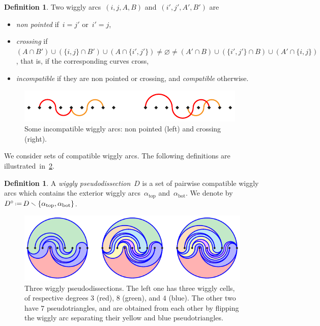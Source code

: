 \documentclass{amsart}
\theoremstyle{definition}
\newtheorem{definition}[theorem]{Definition}
\newcommand{\ssm}{\smallsetminus} %
\newcommand{\eqdef}{\mbox{\,\raisebox{0.2ex}{\scriptsize\ensuremath{\mathrm:}}\ensuremath{=}\,}} %
\newcommand{\darkblue}{\color{darkblue}} %
\newcommand{\defn}[1]{\textsl{\darkblue #1}} %
\begin{document}
\begin{definition}\label{def:compatible}
Two wiggly arcs~$(i,j,A,B)$ and~$(i',j',A',B')$ are 
\begin{itemize}
\item \defn{non pointed} if~$i = j'$ or~$i' = j$,
\item \defn{crossing} if~$(A \cap B') \cup (\{i,j\} \cap B') \cup (A \cap \{i',j'\}) \ne \varnothing \ne (A' \cap B) \cup (\{i',j'\} \cap B) \cup (A' \cap \{i,j\})$, that is, if the corresponding curves cross,
\item \defn{incompatible} if they are non pointed or crossing, and \defn{compatible} otherwise.
\end{itemize}
%
\begin{figure}[h]
\centerline{\includegraphics[scale=1.3]{incompatible}}
\caption{Some incompatible wiggly arcs: non pointed (left) and crossing (right).}
\label{fig:incompatible}
\end{figure}
\end{definition}

We consider sets of compatible wiggly arcs.
The following definitions are illustrated~in~\cref{fig:pseudodissections}.

\begin{definition}
A \defn{wiggly pseudodissection}~$D$ is a set of pairwise compatible wiggly arcs which contains the exterior wiggly arcs~$\alpha_\mathrm{top}$ and~$\alpha_\mathrm{bot}$. We denote by~$D^\circ \eqdef D \ssm \{\alpha_\mathrm{top}, \alpha_\mathrm{bot}\}$.
%
\begin{figure}[b]
\centerline{\includegraphics[scale=1.5]{pseudodissections}}
\caption{Three wiggly pseudodissections. The left one has three wiggly cells, of respective degrees $3$ (red), $8$ (green), and $4$ (blue). The other two have $7$ pseudotriangles, and are obtained from each other by flipping the wiggly arc separating their yellow and blue pseudotriangles.}
\label{fig:pseudodissections}
\end{figure}
\end{definition}
\end{document}
